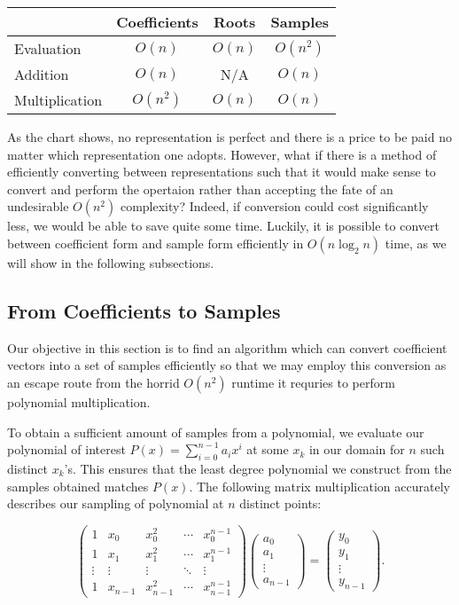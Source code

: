 \documentclass[../article.tex]{subfiles}
\begin{document}
\begin{tabular}{lccc}

&Coefficients&Roots&Samples\\
\hline
Evaluation&$O(n)$&$O(n)$&$O(n^2)$\\
\hline
Addition&$O(n)$&N/A&$O(n)$\\
\hline
Multiplication&$O(n^2)$&$O(n)$&$O(n)$\\
\end{tabular}
\medskip

As the chart shows, no representation is perfect and there is a price to be paid no matter which representation one adopts. However, what if there is a method of efficiently converting between representations such that it would make sense to convert and perform the opertaion rather than accepting the fate of an undesirable $O(n^2)$ complexity? Indeed, if conversion could cost significantly less, we would be able to save quite some time. Luckily, it is possible to convert between  coefficient form and sample form efficiently in $O(n\log_2{n})$ time, as we will show in the following subsections.

\subsection{From Coefficients to Samples}
Our objective in this section is to find an algorithm which can convert coefficient vectors into a set of samples efficiently so that we may employ this conversion as an escape route from the horrid $O(n^2)$ runtime it requries to perform polynomial multiplication.

To obtain a sufficient amount of samples from a polynomial, we evaluate our polynomial of interest $P(x) = \sum_{i=0}^{n-1} a_ix^i$ at some $x_k$ in our domain for $n$ such distinct $x_k$'s. This ensures that the least degree polynomial we construct from the samples obtained matches $P(x)$. The following matrix multiplication accurately describes our sampling of polynomial at $n$ distinct points:

\begin{equation} \label{matrix sampling}
		\begin{pmatrix}
		1 & x_0 & x_0^2 & \cdots & x_0^{n-1}\\
		1 & x_1 & x_1^2& \cdots & x_1^{n-1}\\
		\vdots & \vdots & \vdots & \ddots & \vdots\\
		1 & x_{n-1}  & x_{n-1}^{2}& \cdots & x_{n-1}^{n-1}
		\end{pmatrix}
		\begin{pmatrix}
		a_0\\
		a_1\\
		\vdots\\
		a_{n-1}
		\end{pmatrix}
		=
		\begin{pmatrix}
		y_0\\
		y_1\\
		\vdots\\
		y_{n-1}
		\end{pmatrix}.
\end{equation}
\end{document}
